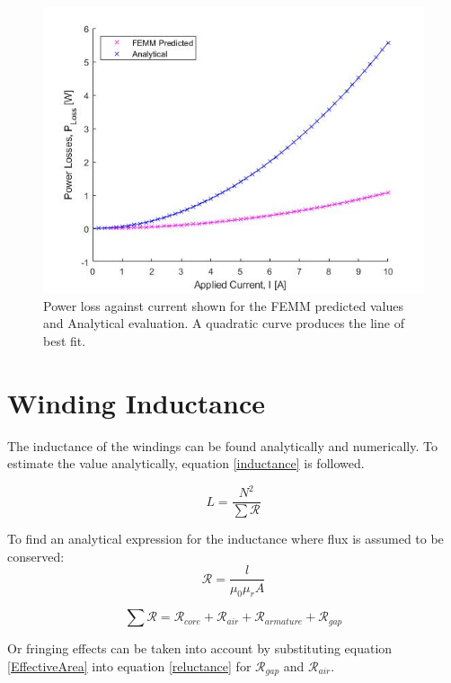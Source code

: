 \documentclass[a4paper]{IEEEtran}
\begin{document}
\begin{figure}[ht]
\includegraphics[width = \linewidth]{ResistanceWindingLoss.jpg}
\caption{Power loss against current shown for the FEMM predicted values and Analytical evaluation. A quadratic curve produces the line of best fit.}
\label{windingLoss} 
\end{figure}

\section{Winding Inductance}
The inductance of the windings can be found analytically and numerically. To estimate the value analytically, equation \ref{inductance} is followed. 

\begin{equation}
L = \frac{N^2}{\sum{\mathcal{R}}}
\label{inductance}
\end{equation}

To find an analytical expression for the inductance where flux is assumed to be conserved:
\begin{equation}
\mathcal{R} =  \frac{l}{\mu_{0}\mu_{r}A}
\label{reluctance}
\end{equation}


\begin{equation}
\sum{\mathcal{R}} = \mathcal{R}_{core} + \mathcal{R}_{air} + \mathcal{R}_{armature} + \mathcal{R}_{gap}
\label{summm}
\end{equation}

Or fringing effects can be taken into account by substituting equation \ref{EffectiveArea} into equation \ref{reluctance} for $\mathcal{R}_{gap}$ and $\mathcal{R}_{air}$. 
\end{document}
